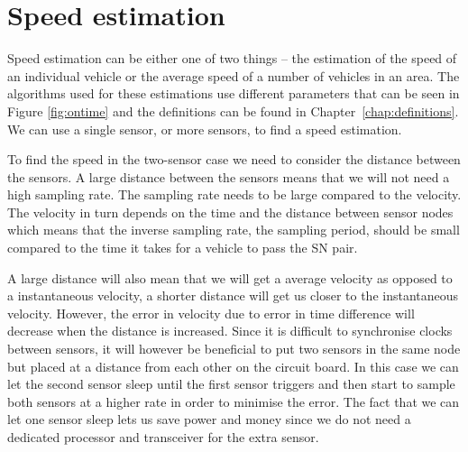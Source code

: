 \section{Speed estimation}

Speed estimation can be either one of two things -- the estimation of the speed of an individual vehicle or the average speed of a number of vehicles in an area. The algorithms used for these estimations use different parameters that can be seen in Figure \ref{fig:ontime} and the definitions can be found in Chapter~\ref{chap:definitions}. We can use a single sensor, or more sensors, to find a speed estimation.

To find the speed in the two-sensor case we need to consider the distance between the sensors. A large distance between the sensors means that we will not need a high sampling rate. The sampling rate needs to be large compared to the velocity. The velocity in turn depends on the time and the distance between sensor nodes which means that the inverse sampling rate, the sampling period, should be small compared to the time it takes for a vehicle to pass the SN pair. 

A large distance will also mean that we will get a average velocity as opposed to a instantaneous velocity, a shorter distance will get us closer to the instantaneous velocity. However, the error in velocity due to error in time difference will decrease when the distance is increased. Since it is difficult to synchronise clocks between sensors, it will however be beneficial to put two sensors in the same node but placed at a distance from each other on the circuit board. In this case we can let the second sensor sleep until the first sensor triggers and then start to sample both sensors at a higher rate in order to minimise the error. The fact that we can let one sensor sleep lets us save power and money since we do not need a dedicated processor and transceiver for the extra sensor.

